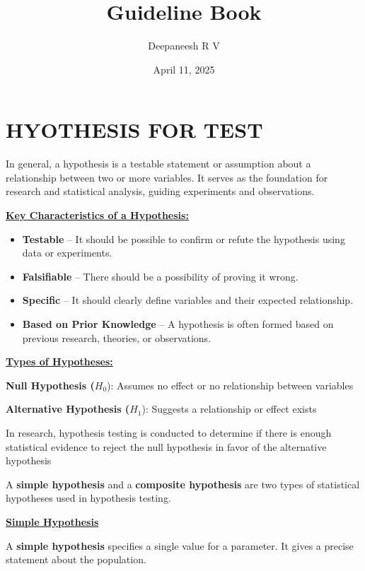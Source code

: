 \documentclass[
]{article}
\title{Guideline Book}
\author{Deepaneesh R V}
\date{April 11, 2025}
\begin{document}
\maketitle

{
\setcounter{tocdepth}{4}
\tableofcontents
}
\newpage

\section{HYOTHESIS FOR TEST}\label{hyothesis-for-test}

In general, a hypothesis is a testable statement or assumption about a
relationship between two or more variables. It serves as the foundation
for research and statistical analysis, guiding experiments and
observations.

\ul{\textbf{Key Characteristics of a Hypothesis:}}

\begin{itemize}
\item
  \textbf{Testable} -- It should be possible to confirm or refute the
  hypothesis using data or experiments.
\item
  \textbf{Falsifiable} -- There should be a possibility of proving it
  wrong.
\item
  \textbf{Specific} -- It should clearly define variables and their
  expected relationship.
\item
  \textbf{Based on Prior Knowledge} -- A hypothesis is often formed
  based on previous research, theories, or observations.
\end{itemize}

\ul{\textbf{Types of Hypotheses:}}

\textbf{Null Hypothesis (}\(H_0\)): Assumes no effect or no relationship
between variables

\textbf{Alternative Hypothesis (}\(H_1\)): Suggests a relationship or
effect exists

In research, hypothesis testing is conducted to determine if there is
enough statistical evidence to reject the null hypothesis in favor of
the alternative hypothesis

A \textbf{simple hypothesis} and a \textbf{composite hypothesis} are two
types of statistical hypotheses used in hypothesis testing.

\ul{\textbf{Simple Hypothesis}}

A \textbf{simple hypothesis} specifies a single value for a parameter.
It gives a precise statement about the population.
\end{document}
